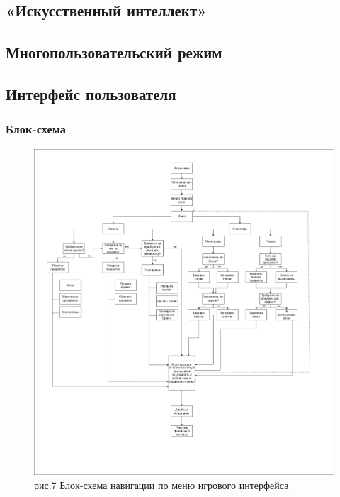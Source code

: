 \documentclass{article}
\begin{document}
\subsection{«Искусственный интеллект»}

\subsection{Многопользовательский режим}

\subsection{Интерфейс пользователя}

\subsubsection{Блок-схема}
\begin{figure}[h]
    \centering
    \includegraphics[width=370px\linewidth]{Интерфейс_диздок_(7.рис).png} \\ рис.7 Блок-схема навигации по меню игрового интерфейса
    \label{fig:artifact}
\end{figure}
\end{document}
